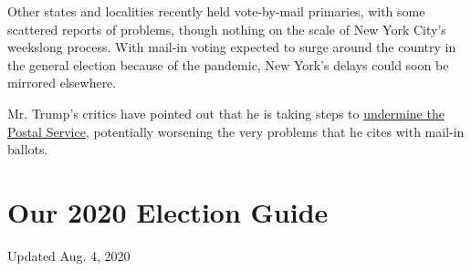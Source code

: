 Other states and localities recently held vote-by-mail primaries, with
some scattered reports of problems, though nothing on the scale of New
York City's weekslong process. With mail-in voting expected to surge
around the country in the general election because of the pandemic, New
York's delays could soon be mirrored elsewhere.

Mr. Trump's critics have pointed out that he is taking steps to
\href{https://www.nytimes.com/2020/07/31/us/politics/trump-usps-mail-delays.html}{undermine
the Postal Service}, potentially worsening the very problems that he
cites with mail-in ballots.

\hypertarget{our-2020-election-guide}{%
\section{Our 2020 Election Guide}\label{our-2020-election-guide}}

Updated Aug. 4, 2020


